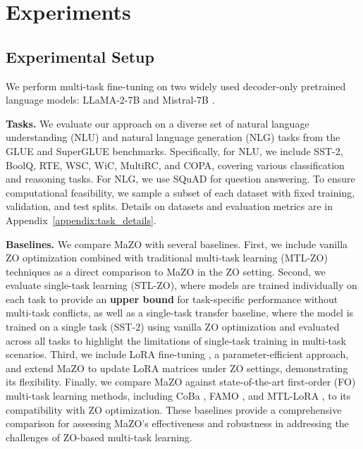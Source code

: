 \section{Experiments}

\subsection{Experimental Setup}

We perform multi-task fine-tuning on two widely used decoder-only pretrained language models: LLaMA-2-7B \citep{touvron2023llama} and Mistral-7B \citep{jiang2023mistral}.%

\textbf{Tasks.} We evaluate our approach on a diverse set of natural language understanding (NLU) and natural language generation (NLG) tasks from the GLUE \citep{wang-etal-2018-glue} and SuperGLUE \citep{wang2019superglue} benchmarks. Specifically, for NLU, we include SST-2, BoolQ, RTE, WSC, WiC, MultiRC, and COPA, covering various classification and reasoning tasks. For NLG, we use SQuAD for question answering. To ensure computational feasibility, we sample a subset of each dataset with fixed training, validation, and test splits. Details on datasets and evaluation metrics are in Appendix~\ref{appendix:task_details}.



\textbf{Baselines.} We compare MaZO with several baselines. First, we include vanilla ZO optimization combined with traditional multi-task learning (MTL-ZO) techniques as a direct comparison to MaZO in the ZO setting. Second, we evaluate single-task learning (STL-ZO), where models are trained individually on each task to provide an {\bf upper bound} for task-specific performance without multi-task conflicts, as well as a single-task transfer baseline, where the model is trained on a single task (SST-2) using vanilla ZO optimization and evaluated across all tasks to highlight the limitations of single-task training in multi-task scenarios. Third, we include LoRA fine-tuning \citep{hu2021lora}, a parameter-efficient approach, and extend MaZO to update LoRA matrices under ZO settings, demonstrating its flexibility. Finally, we compare MaZO against state-of-the-art first-order (FO) multi-task learning methods, including CoBa \citep{gong2024coba}, FAMO \citep{liu2024famo}, and MTL-LoRA \citep{yang2024mtl}, to its compatibility with ZO optimization. These baselines provide a comprehensive comparison for assessing MaZO's effectiveness and robustness in addressing the challenges of ZO-based multi-task learning.


